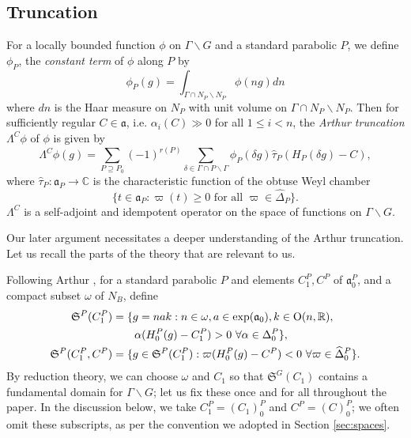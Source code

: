 \documentclass[11pt]{amsart}
\def\R{\mathbb{R}}
\numberwithin{theorem}{section}
\numberwithin{equation}{section}
\theoremstyle{remark}
\theoremstyle{definition}
\newcommand{\C}{\mathbb{C}}
\newcommand{\ga}{\mathfrak{a}}
\begin{document}
\subsection{Truncation} \label{sec:trunc}

For a locally bounded function $\phi$ on $\Gamma \backslash G$ and a standard parabolic $P$, we define $\phi_P$, the \emph{constant term} of $\phi$ along $P$ by
\begin{equation*}
\phi_P(g) = \int_{\Gamma \cap {N_P} \backslash N_P} \phi(ng)dn
\end{equation*}
where $dn$ is the Haar measure on $N_P$ with unit volume on $\Gamma \cap {N_P} \backslash N_P$. Then for sufficiently regular $C \in \ga$, i.e. $\alpha_i(C) \gg 0$ for all $1 \leq i < n$, the \emph{Arthur truncation} $\Lambda^C\phi$ of $\phi$ is given by
\begin{equation} \label{eq:arthur_t}
\Lambda^C\phi(g) = \sum_{P \supseteq P_0} (-1)^{r(P)} \sum_{\delta \in \Gamma \cap P \backslash \Gamma}\phi_P(\delta g)\widehat\tau_P(H_P(\delta g) - C),
\end{equation}
where $\widehat\tau_P: \ga_P \rightarrow \C$ is the characteristic function of the obtuse Weyl chamber
\begin{equation} \label{eq:obt_Weyl}
\{t \in \ga_P: \varpi(t) \geq 0 \mbox{ for all } \varpi \in \widehat\Delta_P\}.
\end{equation}
$\Lambda^C$ is a self-adjoint and idempotent operator on the space of functions on $\Gamma \backslash G$. 

Our later argument necessitates a deeper understanding of the Arthur truncation. Let us recall the parts of the theory that are relevant to us.

Following Arthur \cite[Sec. 8]{Art05}, for a standard parabolic $P$ and elements $C_1^P, C^P$ of $\ga_0^P$, and a compact subset $\omega$ of $N_B$, define
\begin{align*}
\mathfrak S^P(C_1^P) &= \{g = nak: n \in \omega, a \in \exp(\ga_0), k \in \mathrm{O}(n,\R), \\
&\hspace{7mm}\alpha(H_0^{P}(g) - C_1^P) > 0\ \forall \alpha \in \Delta_0^P\}, \\
\mathfrak S^P(C_1^P,C^P) &= \{g \in \mathfrak S^P(C_1^P): \varpi(H_0^{P}(g) - C^P) < 0 \ \forall \varpi \in \widehat\Delta_0^P\}.
\end{align*}
By reduction theory, we can choose $\omega$ and $C_1$ so that $\mathfrak S^G(C_1)$ contains a fundamental domain for $\Gamma \backslash G$; let us fix these once and for all throughout the paper. In the discussion below, we take $C_1^P = (C_1)_0^P$ and $C^P = (C)_0^P$; we often omit these subscripts, as per the convention we adopted in Section \ref{sec:spaces}.
\end{document}
